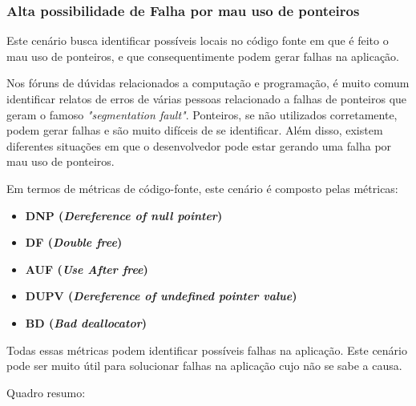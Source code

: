 \subsubsection{Alta possibilidade de Falha por mau uso de ponteiros}
Este cenário busca identificar possíveis locais no código fonte em que é feito o mau uso de ponteiros, e que consequentimente podem gerar falhas na aplicação. 

Nos fóruns de dúvidas relacionados a computação e programação, é muito comum identificar relatos de erros de várias pessoas relacionado a falhas de ponteiros que geram o famoso \emph{"segmentation fault"}. Ponteiros, se não utilizados corretamente, podem gerar falhas e são muito difíceis de se identificar. Além disso, existem diferentes situações em que o desenvolvedor pode estar gerando uma falha por mau uso de ponteiros.

Em termos de métricas de código-fonte, este cenário é composto pelas métricas:
\begin{itemize}
	\item \textbf{DNP (\emph{Dereference of null pointer})}
	\item \textbf{DF (\emph{Double free})}
	\item \textbf{AUF (\emph{Use After free})}
	\item \textbf{DUPV (\emph{Dereference of undefined pointer value})}
	\item \textbf{BD (\emph{Bad deallocator})}
\end{itemize}

Todas essas métricas podem identificar possíveis falhas na aplicação. Este cenário pode ser muito útil para solucionar falhas na aplicação cujo não se sabe a causa.

Quadro resumo:

